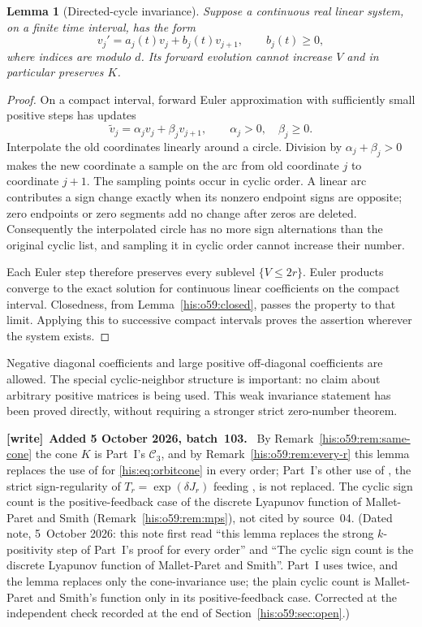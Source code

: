 \documentclass[11pt]{article}
\newtheorem{lemma}[theorem]{Lemma}
\theoremstyle{remark}\newtheorem{remark}[theorem]{Remark}
\numberwithin{equation}{section}
\newenvironment{writenote}[1][]{\par\smallskip\begingroup\small
 \noindent\textbf{[write]}\if\relax\detokenize{#1}\relax\else~\textbf{#1.}\fi\ }%
 {\par\endgroup\smallskip}
\begin{document}
\begin{lemma}[Directed-cycle invariance]\label{his:o59:invariance}
Suppose a continuous real linear system, on a finite time interval,
has the form
\begin{equation}\label{his:o59:cyclic-system}
v_j'=a_j(t)v_j+b_j(t)v_{j+1},\qquad b_j(t)\ge0,
\end{equation}
where indices are modulo $d$. Its forward evolution cannot increase
$V$ and in particular preserves $K$.
\end{lemma}
\begin{proof}
On a compact interval, forward Euler approximation with sufficiently
small positive steps has updates
\[
\widetilde v_j=\alpha_jv_j+\beta_jv_{j+1},
\qquad \alpha_j>0,\quad\beta_j\ge0.
\]
Interpolate the old coordinates linearly around a circle. Division by
$\alpha_j+\beta_j>0$ makes the new coordinate a sample on the arc from
old coordinate $j$ to coordinate $j+1$. The sampling points occur in
cyclic order. A linear arc contributes a sign change exactly when its
nonzero endpoint signs are opposite; zero endpoints or zero segments
add no change after zeros are deleted. Consequently the interpolated
circle has no more sign alternations than the original cyclic list,
and sampling it in cyclic order cannot increase their number.

Each Euler step therefore preserves every sublevel $\{V\le2r\}$.
Euler products converge to the exact solution for continuous linear
coefficients on the compact interval. Closedness, from
Lemma~\ref{his:o59:closed}, passes the property to that limit. Applying this
to successive compact intervals proves the assertion wherever the
system exists.
\end{proof}
Negative diagonal coefficients and large positive off-diagonal
coefficients are allowed. The special cyclic-neighbor structure is
important: no claim about arbitrary positive matrices is being used.
This weak invariance statement has been proved directly, without
requiring a stronger strict zero-number theorem.
\begin{writenote}[Added 5 October 2026, batch~103]
By Remark~\ref{his:o59:rem:same-cone} the cone $K$ is Part~I's $\mathcal C_3$, and by Remark~\ref{his:o59:rem:every-r} this lemma replaces the use of \cite{weiss2021} for \eqref{his:eq:orbitcone} in every order; Part~I's other use of \cite{weiss2021}, the strict sign-regularity of $T_r=\exp(\delta J_r)$ feeding \cite{alseidi2019}, is not replaced. The cyclic sign count is the positive-feedback case of the discrete Lyapunov function of Mallet-Paret and Smith (Remark~\ref{his:o59:rem:mps}), not cited by source~04.
(Dated note, 5~October 2026: this note first read ``this lemma replaces the strong $k$-positivity step of Part~I's proof for every order'' and ``The cyclic sign count is the discrete Lyapunov function of Mallet-Paret and Smith''. Part~I uses \cite{weiss2021} twice, and the lemma replaces only the cone-invariance use; the plain cyclic count is Mallet-Paret and Smith's function only in its positive-feedback case. Corrected at the independent check recorded at the end of Section~\ref{his:o59:sec:open}.)
\end{writenote}
\end{document}
